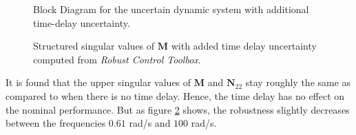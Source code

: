 \begin{figure}[htb]
\begin{tikzpicture}[auto, node distance=2cm, >=stealth']
    
    \end{tikzpicture}
    
	  \caption{Block Diagram for the uncertain dynamic system with additional time-delay uncertainty.}
    \label{fig:blockDiagramC}
\end{figure}
\begin{figure}[h!]
    \centering
    \scalebox{0.7}{
    \begin{tikzpicture}
        
    \end{tikzpicture}}
    \caption{Structured singular values of $\mathbf{M}$ with added time delay uncertainty computed from \emph{Robust Control Toolbox}.}
    \label{fig:ssv2}
\end{figure}

It is found that the upper singular values of $\mathbf{M}$ and $\mathbf{N}_{22}$ stay roughly the same as compared to when there is no time delay. Hence, the time delay has no effect on the nominal performance. But as figure \ref{fig:ssv2} shows, the robustness slightly decreases between the frequencies $0.61$ rad/s and $100$ rad/s.